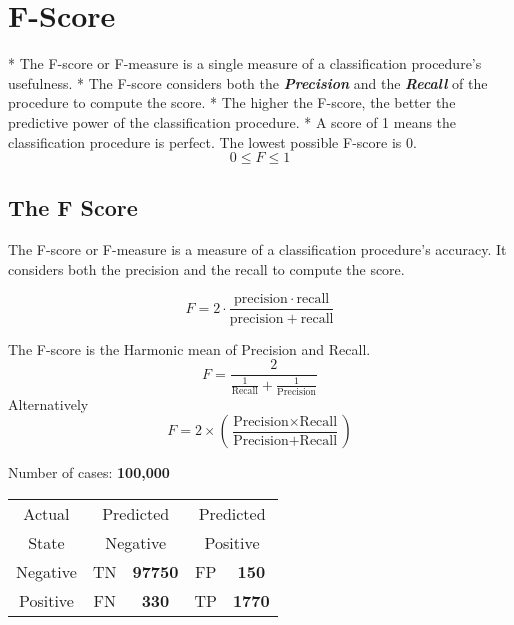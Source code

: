 \section*{F-Score}


*  The F-score or F-measure is a single measure of a classification procedure's usefulness. 
*  The F-score considers both the \textit{\textbf{Precision}} and the \textit{\textbf{Recall}} of the procedure to compute the score.
*  The higher the F-score, the better the predictive power of the 
classification procedure. 
*  A score of 1 means the classification procedure is perfect. The lowest possible F-score is 0.
\[ 0 \leq F \leq 1 \]


\subsection{The F Score}

The F-score or F-measure is a measure of a classification procedure's accuracy.
It considers both the precision  and the recall to compute the score.

\[ F = 2 \cdot \frac{\mathrm{precision} \cdot \mathrm{recall}}{\mathrm{precision} + \mathrm{recall}}\]



 The F-score is the Harmonic mean of Precision and Recall.
\[ F = \frac{2}{\frac{1}{\mbox{Recall}} + \frac{1}{\mbox{Precision}}} \]
Alternatively
\[ F = 2 \times \left( \frac{\mbox{Precision} \times \mbox{Recall}}{\mbox{Precision} + \mbox{Recall}} \right) \] 





Number of cases: \textbf{100,000}\\ 
\begin{center}
\begin{table}[!htbp]
\begin{tabular}{c  *4c}
\hline
Actual &  \multicolumn{2}{c}{Predicted} & \multicolumn{2}{c}{Predicted}\\
State &  \multicolumn{2}{c}{Negative} & \multicolumn{2}{c}{Positive}\\
\hline
Negative   & \phantom{spa} TN & \textbf{97750}\phantom{spa}   & FP  & \textbf{150}\\
Positive   & \phantom{spa} FN & \textbf{330} \phantom{spa}   & TP  & \textbf{1770}\\

\hline
\end{tabular}
\end{table}
\end{center}

